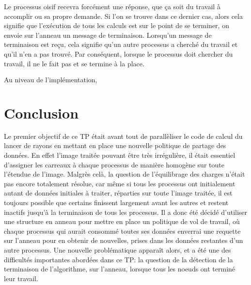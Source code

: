 \documentclass[a4paper,11pt]{article}
\begin{document}
Le processus oisif recevra forcément une réponse, que ça soit du travail à accomplir ou sa propre demande. Si l'on se trouve dans ce dernier cas, alors cela signifie que l'exécution de tous les calculs est sur le point de se terminer, on envoie sur l'anneau un message de terminaison. Lorsqu'un message de terminaison est reçu, cela signifie qu'un autre processus a cherché du travail et qu'il n'en a pas trouvé. Par conséquent, lorsque le processus doit chercher du travail, il ne le fait pas et se termine à la place.

Au niveau de l'implémentation, 


\section{Conclusion}
Le premier objectif de ce TP était avant tout de parallèliser le code de calcul du lancer de rayons en mettant en place une nouvelle politique de partage des données. En effet l'image traitée pouvant être très irrégulière, il était essentiel d'assigner les carreaux à chaque processus de manière homogène sur toute l'étendue de l'image. Malgrès celà, la question de l'équilibrage des charges n'était pas encore totalement résolue, car même si tous les processus ont initialement autant de données initiales à traiter, réparties sur toute l'image traitée, il est toujours possible que certains finissent largement avant les autres et restent inactifs jusqu'à la terminaison de tous les processus.  Il a donc été décidé d'utiliser une structure en anneau pour mettre en place un politique de vol de travail, où chaque processus qui aurait consommé toutes ses données enverrai une requette sur l'anneau pour en obtenir de nouvelles, prises dans les données restantes d'un autre processus. Une nouvelle problématique apparaît alors, et a été une des difficultés importantes abordées dans ce TP: la question de la détection de la terminaison de l'algorithme, sur l'anneau, lorsque tous les noeuds ont terminé leur travail.
\end{document}
